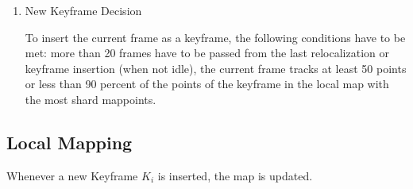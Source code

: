 \begin{enumerate}
	
	
	\item New Keyframe Decision 
	
	To insert the current frame as a keyframe, the following conditions have to be met:
	more than 20 frames have to be passed from the last relocalization or keyframe insertion (when not idle), 
    the current frame tracks at least 50 points or less than 90 percent of the points of the keyframe in the local 
    map with the most shard mappoints. 	
	
	
	\end{enumerate}
	

	
	\subsection{Local Mapping}
	
	Whenever a new Keyframe $K_i$ is inserted, the map is updated. 
	
